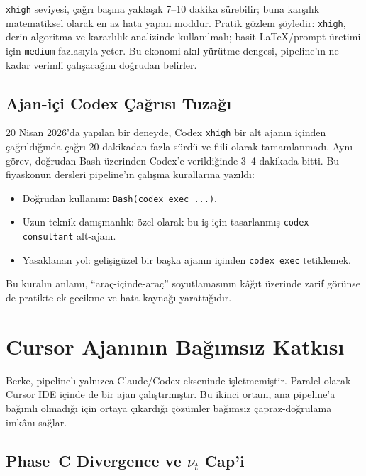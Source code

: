 \noindent
\texttt{xhigh} seviyesi, çağrı başına yaklaşık 7--10 dakika sürebilir;
buna karşılık matematiksel olarak en az hata yapan moddur. Pratik
gözlem şöyledir: \texttt{xhigh}, derin algoritma ve kararlılık
analizinde kullanılmalı; basit LaTeX/prompt üretimi için
\texttt{medium} fazlasıyla yeter. Bu ekonomi-akıl yürütme dengesi,
pipeline'ın ne kadar verimli çalışacağını doğrudan belirler.

\subsection{Ajan-içi Codex Çağrısı Tuzağı}

20 Nisan 2026'da yapılan bir deneyde, Codex \texttt{xhigh} bir alt
ajanın içinden çağrıldığında çağrı 20 dakikadan fazla sürdü ve fiili
olarak tamamlanmadı. Aynı görev, doğrudan Bash üzerinden Codex'e
verildiğinde 3--4 dakikada bitti. Bu fiyaskonun dersleri pipeline'ın
çalışma kurallarına yazıldı:

\begin{itemize}
  \item Doğrudan kullanım: \texttt{Bash(codex exec ...)}.
  \item Uzun teknik danışmanlık: özel olarak bu iş için tasarlanmış
        \texttt{codex-consultant} alt-ajanı.
  \item Yasaklanan yol: gelişigüzel bir başka ajanın içinden
        \texttt{codex exec} tetiklemek.
\end{itemize}

Bu kuralın anlamı, ``araç-içinde-araç'' soyutlamasının kâğıt üzerinde
zarif görünse de pratikte ek gecikme ve hata kaynağı yarattığıdır.

\section{Cursor Ajanının Bağımsız Katkısı}
\label{sec:ma_cursor}

Berke, pipeline'ı yalnızca Claude/Codex ekseninde işletmemiştir.
Paralel olarak Cursor IDE içinde de bir ajan çalıştırmıştır. Bu
ikinci ortam, ana pipeline'a bağımlı olmadığı için ortaya çıkardığı
çözümler bağımsız çapraz-doğrulama imkânı sağlar.

\subsection{Phase~C Divergence ve $\nu_t$ Cap'i}

